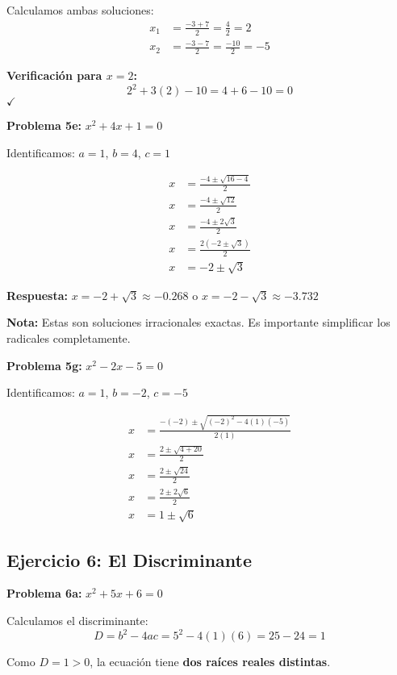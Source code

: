 Calculamos ambas soluciones:
\begin{align}
x_1 &= \frac{-3 + 7}{2} = \frac{4}{2} = 2\\
x_2 &= \frac{-3 - 7}{2} = \frac{-10}{2} = -5
\end{align}

\textbf{Verificación para $x = 2$:}
$$2^2 + 3(2) - 10 = 4 + 6 - 10 = 0$$ $\checkmark$

\textbf{Problema 5e:} $x^2 + 4x + 1 = 0$

Identificamos: $a = 1$, $b = 4$, $c = 1$

\begin{align}
x &= \frac{-4 \pm \sqrt{16 - 4}}{2}\\
x &= \frac{-4 \pm \sqrt{12}}{2}\\
x &= \frac{-4 \pm 2\sqrt{3}}{2}\\
x &= \frac{2(-2 \pm \sqrt{3})}{2}\\
x &= -2 \pm \sqrt{3}
\end{align}

\textbf{Respuesta:} $x = -2 + \sqrt{3} \approx -0.268$ o $x = -2 - \sqrt{3} \approx -3.732$

\textbf{Nota:} Estas son soluciones irracionales exactas. Es importante simplificar los radicales completamente.

\textbf{Problema 5g:} $x^2 - 2x - 5 = 0$

Identificamos: $a = 1$, $b = -2$, $c = -5$

\begin{align}
x &= \frac{-(-2) \pm \sqrt{(-2)^2 - 4(1)(-5)}}{2(1)}\\
x &= \frac{2 \pm \sqrt{4 + 20}}{2}\\
x &= \frac{2 \pm \sqrt{24}}{2}\\
x &= \frac{2 \pm 2\sqrt{6}}{2}\\
x &= 1 \pm \sqrt{6}
\end{align}


\subsection*{Ejercicio 6: El Discriminante}

\textbf{Problema 6a:} $x^2 + 5x + 6 = 0$

Calculamos el discriminante:
$$D = b^2 - 4ac = 5^2 - 4(1)(6) = 25 - 24 = 1$$

Como $D = 1 > 0$, la ecuación tiene \textbf{dos raíces reales distintas}.


